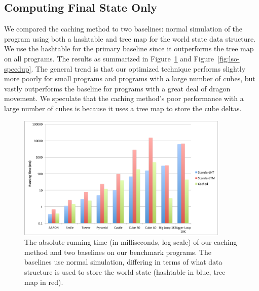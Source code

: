 \documentclass{sig-alternate}
\newcommand{\todo}[1]{{\color{red} TODO: #1}}
\begin{document}

\subsection{Computing Final State Only}
We compared the caching method to two baselines: normal simulation of the program using both a hashtable and tree map for the world state data structure. We use the hashtable for the primary baseline since it outperforms the tree map on all programs. The results as summarized in Figure~\ref{fig:lso-absolute} and Figure~\ref{fig:lso-speedup}. The general trend is that our optimized technique performs slightly more poorly for small programs and programs with a large number of cubes, but vastly outperforms the baseline for programs with a great deal of dragon movement. We speculate that the caching method's poor performance with a large number of cubes is because it uses a tree map to store the cube deltas. 

\begin{figure}[ht!]
  \centering
  \includegraphics[width=0.9\textwidth]{images/lso-absolute}
  \caption{The absolute running time (in milliseconds, log scale) of our caching method and two baselines on our benchmark programs. The baselines use normal simulation, differing in terms of what data structure is used to store the world state (hashtable in blue, tree map in red). }
  \label{fig:lso-absolute}
\end{figure}
\end{document}
